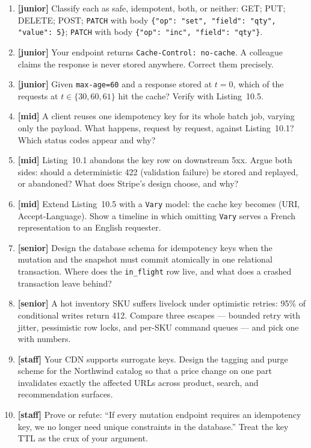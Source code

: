 \begin{enumerate}
  \item \textbf{[junior]} Classify each as safe, idempotent, both, or
        neither: GET; PUT; DELETE; POST; \texttt{PATCH} with body
        \texttt{\{"op": "set", "field": "qty", "value": 5\}};
        \texttt{PATCH} with body \texttt{\{"op": "inc", "field": "qty"\}}.
  \item \textbf{[junior]} Your endpoint returns
        \texttt{Cache-Control: no-cache}. A colleague claims the response
        is never stored anywhere. Correct them precisely.
  \item \textbf{[junior]} Given \texttt{max-age=60} and a response stored
        at $t=0$, which of the requests at $t \in \{30, 60, 61\}$ hit the
        cache? Verify with Listing~10.5.
  \item \textbf{[mid]} A client reuses one idempotency key for its whole
        batch job, varying only the payload. What happens, request by
        request, against Listing~10.1? Which status codes appear and why?
  \item \textbf{[mid]} Listing~10.1 abandons the key row on downstream
        5xx. Argue both sides: should a deterministic 422 (validation
        failure) be stored and replayed, or abandoned? What does Stripe's
        design choose, and why?
  \item \textbf{[mid]} Extend Listing~10.5 with a \texttt{Vary} model: the
        cache key becomes (URI, Accept-Language). Show a timeline in which
        omitting \texttt{Vary} serves a French representation to an English
        requester.
  \item \textbf{[senior]} Design the database schema for idempotency keys
        when the mutation and the snapshot must commit atomically in one
        relational transaction. Where does the \texttt{in\_flight} row
        live, and what does a crashed transaction leave behind?
  \item \textbf{[senior]} A hot inventory SKU suffers livelock under
        optimistic retries: 95\% of conditional writes return 412. Compare
        three escapes --- bounded retry with jitter, pessimistic row locks,
        and per-SKU command queues --- and pick one with numbers.
  \item \textbf{[staff]} Your CDN supports surrogate keys. Design the
        tagging and purge scheme for the Northwind catalog so that a price
        change on one part invalidates exactly the affected URLs across
        product, search, and recommendation surfaces.
  \item \textbf{[staff]} Prove or refute: ``If every mutation endpoint
        requires an idempotency key, we no longer need unique constraints
        in the database.'' Treat the key TTL as the crux of your argument.
\end{enumerate}


